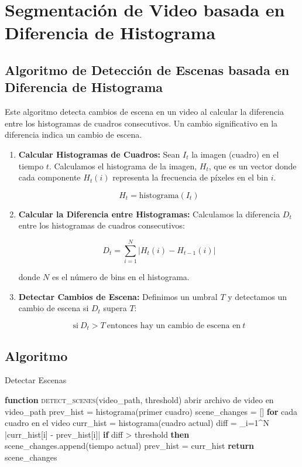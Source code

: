 \documentclass{article}
\begin{document}
\section*{Segmentación de Video basada en Diferencia de Histograma}

\subsection*{Algoritmo de Detección de Escenas basada en Diferencia de Histograma}

Este algoritmo detecta cambios de escena en un video al calcular la diferencia entre los histogramas de cuadros consecutivos. Un cambio significativo en la diferencia indica un cambio de escena.

\begin{enumerate}
    \item \textbf{Calcular Histogramas de Cuadros:} Sean \( I_t \) la imagen (cuadro) en el tiempo \( t \). Calculamos el histograma de la imagen, \( H_t \), que es un vector donde cada componente \( H_t(i) \) representa la frecuencia de píxeles en el bin \( i \).
    
    \[
    H_t = \text{histograma}(I_t)
    \]
    
    \item \textbf{Calcular la Diferencia entre Histogramas:} Calculamos la diferencia \( D_t \) entre los histogramas de cuadros consecutivos:
    
    \[
    D_t = \sum_{i=1}^{N} \left| H_t(i) - H_{t-1}(i) \right|
    \]
    
    donde \( N \) es el número de bins en el histograma.
    
    \item \textbf{Detectar Cambios de Escena:} Definimos un umbral \( T \) y detectamos un cambio de escena si \( D_t \) supera \( T \):
    
    \[
    \text{si} \ D_t > T \ \text{entonces hay un cambio de escena en} \ t
    \]
\end{enumerate}

\subsection*{Algoritmo}
\begin{algorithm}
\caption{Detectar Escenas}
\begin{algorithmic}[1]
\STATE \textbf{function} \textsc{detect\_scenes}(video\_path, threshold)
\STATE \quad abrir archivo de video en video\_path
\STATE \quad prev\_hist = histograma(primer cuadro)
\STATE \quad scene\_changes = []
\STATE \quad \textbf{for} cada cuadro en el video
\STATE \quad \quad curr\_hist = histograma(cuadro actual)
\STATE \quad \quad diff = \sum_{i=1}^{N} |curr\_hist[i] - prev\_hist[i]|
\STATE \quad \quad \textbf{if} diff > threshold \textbf{then}
\STATE \quad \quad \quad scene\_changes.append(tiempo actual)
\STATE \quad \quad prev\_hist = curr\_hist
\STATE \quad \textbf{return} scene\_changes
\end{algorithmic}
\end{algorithm}
\end{document}
